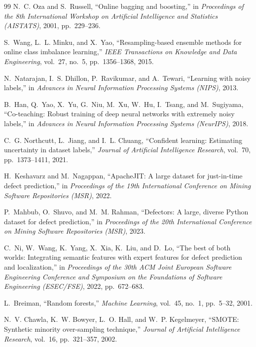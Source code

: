 \documentclass[12pt,a4paper,oneside]{report}
\begin{document}
{\begin{thebibliography}{99}
N.~C. Oza and S.~Russell, ``Online bagging and boosting,'' in
\emph{Proceedings of the 8th International Workshop on Artificial Intelligence
and Statistics (AISTATS)}, 2001, pp.~229--236.

S.~Wang, L.~L. Minku, and X.~Yao, ``Resampling-based ensemble methods for
online class imbalance learning,'' \emph{IEEE Transactions on Knowledge and
Data Engineering}, vol.~27, no.~5, pp.~1356--1368, 2015.

N.~Natarajan, I.~S. Dhillon, P.~Ravikumar, and A.~Tewari, ``Learning with noisy
labels,'' in \emph{Advances in Neural Information Processing Systems (NIPS)},
2013.

B.~Han, Q.~Yao, X.~Yu, G.~Niu, M.~Xu, W.~Hu, I.~Tsang, and M.~Sugiyama,
``Co-teaching: Robust training of deep neural networks with extremely noisy
labels,'' in \emph{Advances in Neural Information Processing Systems
(NeurIPS)}, 2018.

C.~G. Northcutt, L.~Jiang, and I.~L. Chuang, ``Confident learning: Estimating
uncertainty in dataset labels,'' \emph{Journal of Artificial Intelligence
Research}, vol.~70, pp.~1373--1411, 2021.

H.~Keshavarz and M.~Nagappan, ``ApacheJIT: A large dataset for just-in-time
defect prediction,'' in \emph{Proceedings of the 19th International Conference
on Mining Software Repositories (MSR)}, 2022.

P.~Mahbub, O.~Shuvo, and M.~M. Rahman, ``Defectors: A large, diverse Python
dataset for defect prediction,'' in \emph{Proceedings of the 20th International
Conference on Mining Software Repositories (MSR)}, 2023.

C.~Ni, W.~Wang, K.~Yang, X.~Xia, K.~Liu, and D.~Lo, ``The best of both worlds:
Integrating semantic features with expert features for defect prediction and
localization,'' in \emph{Proceedings of the 30th ACM Joint European Software
Engineering Conference and Symposium on the Foundations of Software
Engineering (ESEC/FSE)}, 2022, pp.~672--683.

L.~Breiman, ``Random forests,'' \emph{Machine Learning}, vol.~45, no.~1,
pp.~5--32, 2001.

N.~V. Chawla, K.~W. Bowyer, L.~O. Hall, and W.~P. Kegelmeyer, ``SMOTE:
Synthetic minority over-sampling technique,'' \emph{Journal of Artificial
Intelligence Research}, vol.~16, pp.~321--357, 2002.


\end{thebibliography}}
\end{document}
